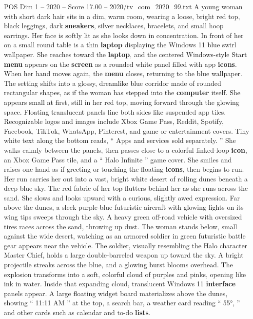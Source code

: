 \begin{textsample}{POS Dim 1 – 2020 – Score 17.00 – 2020/tv\_com\_2020\_99.txt}  \label{ex:f1_pos_007}
A young woman with short dark hair sits in a dim, warm room, wearing a loose, bright red top, black leggings, dark \textbf{sneakers}, silver necklaces, bracelets, and small hoop earrings.
Her face is softly lit as she looks down in concentration.
In front of her on a small round table is a thin \textbf{laptop} displaying the Windows 11 blue swirl wallpaper.
She reaches toward the \textbf{laptop}, and the centered Windows-style Start \textbf{menu} appears on the \textbf{screen} as a rounded white panel filled with app \textbf{icons}.
When her hand moves again, the \textbf{menu} closes, returning to the blue wallpaper.
The setting shifts into a glossy, dreamlike blue corridor made of rounded rectangular shapes, as if the woman has stepped into the \textbf{computer} itself.
She appears small at first, still in her red top, moving forward through the glowing space.
Floating translucent panels line both sides like suspended app tiles.
Recognizable logos and images include Xbox Game Pass, Reddit, Spotify, Facebook, TikTok, WhatsApp, Pinterest, and game or entertainment covers.
Tiny white text along the bottom reads, “ Apps and services sold separately. ” She walks calmly between the panels, then passes close to a colorful linked-loop \textbf{icon}, an Xbox Game Pass tile, and a “ Halo Infinite ” game cover.
She smiles and raises one hand as if greeting or touching the floating \textbf{icons}, then begins to run.
Her run carries her out into a vast, bright white desert of rolling dunes beneath a deep blue sky.
The red fabric of her top flutters behind her as she runs across the sand.
She slows and looks upward with a curious, slightly awed expression.
Far above the dunes, a sleek purple-blue futuristic aircraft with glowing lights on its wing tips sweeps through the sky.
A heavy green off-road vehicle with oversized tires races across the sand, throwing up dust.
The woman stands below, small against the wide desert, watching as an armored soldier in green futuristic battle gear appears near the vehicle.
The soldier, visually resembling the Halo character Master Chief, holds a large double-barreled weapon up toward the sky.
A bright projectile streaks across the blue, and a glowing burst blooms overhead.
The explosion transforms into a soft, colorful cloud of purples and pinks, opening like ink in water.
Inside that expanding cloud, translucent Windows 11 \textbf{interface} panels appear.
A large floating widget board materializes above the dunes, showing “ 11:11 AM ” at the top, a search bar, a weather card reading “ 55{\EmojiFont °}, ” and other cards such as calendar and to-do \textbf{lists}.

\end{textsample}
